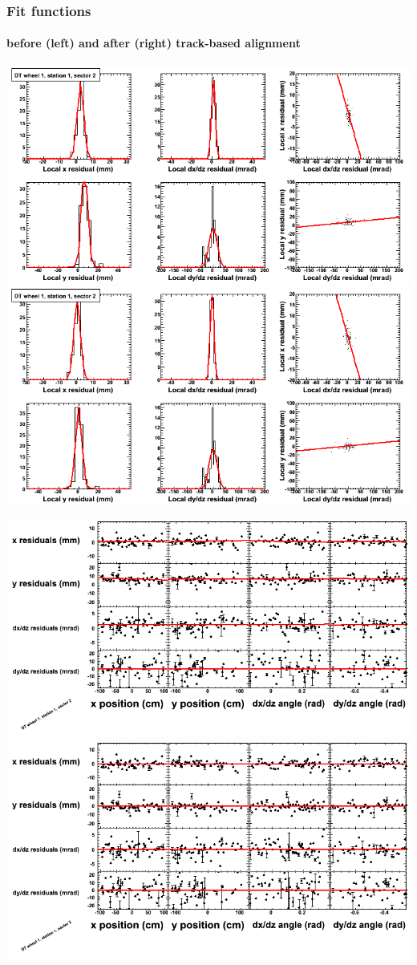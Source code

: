 \documentclass[compress]{beamer}
\begin{document}
\begin{frame}
\frametitle{Fit functions}
\framesubtitle{before (left) and after (right) track-based alignment}
\includegraphics[width=0.5\linewidth]{fitfunctions_re01/MBwhDst1sec02_bellcurves.png} \includegraphics[width=0.5\linewidth]{fitfunctions_re05/MBwhDst1sec02_bellcurves.png}

\includegraphics[width=0.5\linewidth]{fitfunctions_re01/MBwhDst1sec02_polynomials.png} \includegraphics[width=0.5\linewidth]{fitfunctions_re05/MBwhDst1sec02_polynomials.png}
\end{frame}
\end{document}
